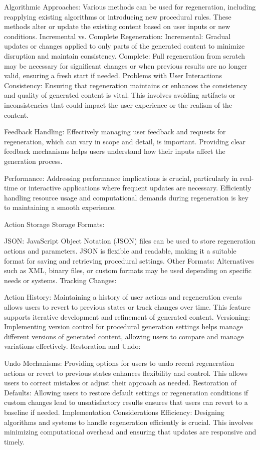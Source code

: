 Algorithmic Approaches: Various methods can be used for regeneration, including reapplying existing algorithms or introducing new procedural rules. These methods alter or update the existing content based on user inputs or new conditions.
Incremental vs. Complete Regeneration:
Incremental: Gradual updates or changes applied to only parts of the generated content to minimize disruption and maintain consistency.
Complete: Full regeneration from scratch may be necessary for significant changes or when previous results are no longer valid, ensuring a fresh start if needed.
Problems with User Interactions
Consistency: Ensuring that regeneration maintains or enhances the consistency and quality of generated content is vital. This involves avoiding artifacts or inconsistencies that could impact the user experience or the realism of the content.

Feedback Handling: Effectively managing user feedback and requests for regeneration, which can vary in scope and detail, is important. Providing clear feedback mechanisms helps users understand how their inputs affect the generation process.

Performance: Addressing performance implications is crucial, particularly in real-time or interactive applications where frequent updates are necessary. Efficiently handling resource usage and computational demands during regeneration is key to maintaining a smooth experience.

Action Storage
Storage Formats:

JSON: JavaScript Object Notation (JSON) files can be used to store regeneration actions and parameters. JSON is flexible and readable, making it a suitable format for saving and retrieving procedural settings.
Other Formats: Alternatives such as XML, binary files, or custom formats may be used depending on specific needs or systems.
Tracking Changes:

Action History: Maintaining a history of user actions and regeneration events allows users to revert to previous states or track changes over time. This feature supports iterative development and refinement of generated content.
Versioning: Implementing version control for procedural generation settings helps manage different versions of generated content, allowing users to compare and manage variations effectively.
Restoration and Undo:

Undo Mechanisms: Providing options for users to undo recent regeneration actions or revert to previous states enhances flexibility and control. This allows users to correct mistakes or adjust their approach as needed.
Restoration of Defaults: Allowing users to restore default settings or regeneration conditions if custom changes lead to unsatisfactory results ensures that users can revert to a baseline if needed.
Implementation Considerations
Efficiency: Designing algorithms and systems to handle regeneration efficiently is crucial. This involves minimizing computational overhead and ensuring that updates are responsive and timely.


